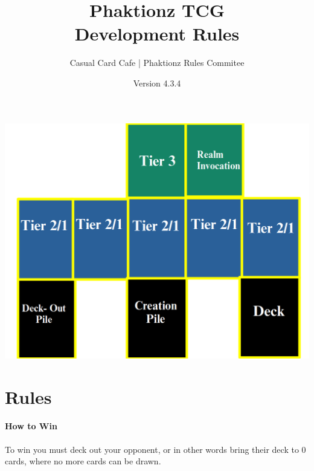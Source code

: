\documentclass[12pt, letterpaper]{article}
\title{Phaktionz TCG \\Development Rules}
\author{Casual Card Cafe | Phaktionz Rules Commitee}
\date{Version 4.3.4}
\begin{document}
\maketitle
{}
\newpage
\tableofcontents
\newpage
\begin{center}
    \includegraphics[scale = 0.25]{images/field.png}
\end{center}


\section{Rules}
\paragraph{How to Win\\}
To win you must deck out your opponent, or in other words bring their deck to 0 cards, where no more cards can be drawn.
\end{document}
